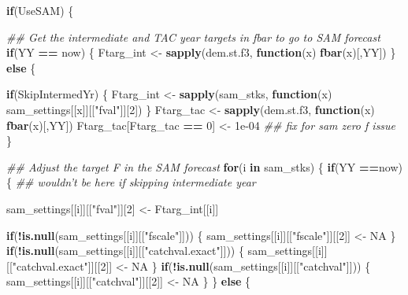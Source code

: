 \documentclass[
]{article}
\newenvironment{Shaded}{\begin{snugshade}}{\end{snugshade}}
\newcommand{\CommentTok}[1]{\textcolor[rgb]{0.56,0.35,0.01}{\textit{#1}}}
\newcommand{\ControlFlowTok}[1]{\textcolor[rgb]{0.13,0.29,0.53}{\textbf{#1}}}
\newcommand{\DecValTok}[1]{\textcolor[rgb]{0.00,0.00,0.81}{#1}}
\newcommand{\FloatTok}[1]{\textcolor[rgb]{0.00,0.00,0.81}{#1}}
\newcommand{\KeywordTok}[1]{\textcolor[rgb]{0.13,0.29,0.53}{\textbf{#1}}}
\newcommand{\NormalTok}[1]{#1}
\newcommand{\OperatorTok}[1]{\textcolor[rgb]{0.81,0.36,0.00}{\textbf{#1}}}
\newcommand{\OtherTok}[1]{\textcolor[rgb]{0.56,0.35,0.01}{#1}}
\newcommand{\StringTok}[1]{\textcolor[rgb]{0.31,0.60,0.02}{#1}}
\begin{document}
\begin{Shaded}
\begin{Highlighting}[]
{{{        \ControlFlowTok{if}\NormalTok{(UseSAM) \{}

           \CommentTok{## Get the intermediate and TAC year targets in fbar to go to SAM forecast}
         \ControlFlowTok{if}\NormalTok{(YY }\OperatorTok{==}\StringTok{ }\NormalTok{now) \{}
\NormalTok{        Ftarg_int <-}\StringTok{ }\KeywordTok{sapply}\NormalTok{(dem.st.f3, }\ControlFlowTok{function}\NormalTok{(x) }\KeywordTok{fbar}\NormalTok{(x)[,YY]) \} }\ControlFlowTok{else}\NormalTok{ \{}
            
            \ControlFlowTok{if}\NormalTok{(SkipIntermedYr) \{}
\NormalTok{            Ftarg_int <-}\StringTok{ }\KeywordTok{sapply}\NormalTok{(sam_stks, }\ControlFlowTok{function}\NormalTok{(x) sam_settings[[x]][[}\StringTok{"fval"}\NormalTok{]][}\DecValTok{2}\NormalTok{])}
\NormalTok{            \}}
\NormalTok{            Ftarg_tac <-}\StringTok{ }\KeywordTok{sapply}\NormalTok{(dem.st.f3, }\ControlFlowTok{function}\NormalTok{(x) }\KeywordTok{fbar}\NormalTok{(x)[,YY])}
\NormalTok{            Ftarg_tac[Ftarg_tac }\OperatorTok{==}\StringTok{ }\DecValTok{0}\NormalTok{] <-}\StringTok{ }\FloatTok{1e-04} \CommentTok{## fix for sam zero f issue}
\NormalTok{            \}}
     
        \CommentTok{## Adjust the target F in the SAM forecast}
        \ControlFlowTok{for}\NormalTok{(i }\ControlFlowTok{in}\NormalTok{ sam_stks) \{}
            \ControlFlowTok{if}\NormalTok{(YY }\OperatorTok{==}\NormalTok{now) \{ }\CommentTok{## wouldn't be here if skipping intermediate year}
        
\NormalTok{            sam_settings[[i]][[}\StringTok{"fval"}\NormalTok{]][}\DecValTok{2}\NormalTok{] <-}\StringTok{ }\NormalTok{Ftarg_int[[i]]}
                    
                \ControlFlowTok{if}\NormalTok{(}\OperatorTok{!}\KeywordTok{is.null}\NormalTok{(sam_settings[[i]][[}\StringTok{"fscale"}\NormalTok{]])) \{}
\NormalTok{            sam_settings[[i]][[}\StringTok{"fscale"}\NormalTok{]][[}\DecValTok{2}\NormalTok{]] <-}\StringTok{ }\OtherTok{NA}
\NormalTok{            \}}
            \ControlFlowTok{if}\NormalTok{(}\OperatorTok{!}\KeywordTok{is.null}\NormalTok{(sam_settings[[i]][[}\StringTok{"catchval.exact"}\NormalTok{]])) \{}
\NormalTok{            sam_settings[[i]][[}\StringTok{"catchval.exact"}\NormalTok{]][[}\DecValTok{2}\NormalTok{]] <-}\StringTok{ }\OtherTok{NA}
\NormalTok{            \}}
            \ControlFlowTok{if}\NormalTok{(}\OperatorTok{!}\KeywordTok{is.null}\NormalTok{(sam_settings[[i]][[}\StringTok{"catchval"}\NormalTok{]])) \{}
\NormalTok{            sam_settings[[i]][[}\StringTok{"catchval"}\NormalTok{]][[}\DecValTok{2}\NormalTok{]] <-}\StringTok{ }\OtherTok{NA}
\NormalTok{            \}}
\NormalTok{            \} }\ControlFlowTok{else}\NormalTok{ \{ }
                
}}}
\end{Highlighting}
\end{Shaded}
\end{document}
